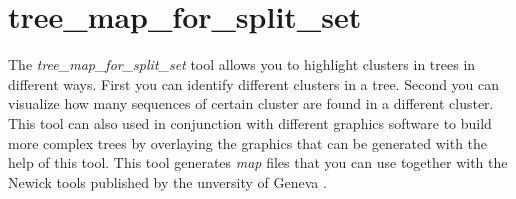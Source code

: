 \section{tree\_map\_for\_split\_set} \label{sec-treemapss}

The \emph{tree\_map\_for\_split\_set} tool allows you to highlight
clusters in trees in different ways. First you can identify different
clusters in a tree. Second you can visualize how many sequences of
certain cluster are found in a different cluster. This tool can also
used in conjunction with different graphics software to build more
complex trees by overlaying the graphics that can be generated with
the help of this tool. This tool generates \emph{map} files that you
can use together with the Newick tools published by the unversity of
Geneva \cite{newick_tools}.

